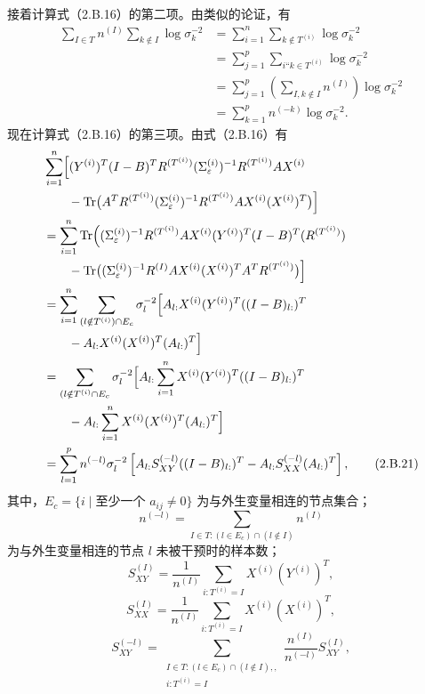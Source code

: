 接着计算式（2.B.16）的第二项。由类似的论证，有
\begin{equation}
\begin{aligned}
\sum_{I\in T}n^{(I)}\sum_{k\notin I}\log\sigma_k^{-2}
 &=\sum_{i=1}^n\sum_{k\notin T^{(i)}}\log\sigma_k^{-2}\\
 &=\sum_{j=1}^p\sum_{i\text{“}k\in T^{(i)}}\log\sigma_k^{-2}\\
 &=\sum_{j=1}^p\left(\sum_{I,k\notin I}n^{(I)}\right)\log\sigma_k^{-2}\\
 &=\sum_{k=1}^pn^{(-k)}\log\sigma_k^{-2}.
\end{aligned}\tag{2.B.20}
\end{equation}
现在计算式（2.B.16）的第三项。由式（2.B.16）有
\begingroup
\allowdisplaybreaks[2]
\begin{align}
&\sum_{i=1}^n\Bigl[(Y^{(i)})^T(I-B)^TR^{(T^{(i)})}
 (\Sigma_\varepsilon^{(i)})^{-1}R^{(T^{(i)})}AX^{(i)}\notag\\
&\qquad-\operatorname{Tr}\bigl(A^TR^{(T^{(i)})}(\Sigma_\varepsilon^{(i)})^{-1}
 R^{(T^{(i)})}AX^{(i)}(X^{(i)})^T\bigr)\Bigr]\notag\\
&=\sum_{i=1}^n\operatorname{Tr}\Bigl(
  (\Sigma_\varepsilon^{(i)})^{-1}R^{(T^{(i)})}AX^{(i)}
  (Y^{(i)})^T(I-B)^T(R^{(T^{(i)})})\notag\\
&\qquad-\operatorname{Tr}\bigl(
  (\Sigma_\varepsilon^{(i)})^{-1}R^{(I)}AX^{(i)}
  (X^{(i)})^TA^TR^{(T^{(i)})}\bigr)\Bigr]\notag\\
&=\sum_{i=1}^n\sum_{(l\notin T^{(i)})\cap E_c}
 \sigma_l^{-2}\Bigl[
 A_{l:}X^{(i)}(Y^{(i)})^T((I-B)_{l:})^T\notag\\
&\qquad-A_{l:}X^{(i)}(X^{(i)})^T(A_{l:})^T\Bigr]\notag\\
&=\sum_{(l\notin T^{(i)}\cap E_c}\sigma_l^{-2}
 \Bigl[A_{l:}\sum_{i=1}^nX^{(i)}(Y^{(i)})^T((I-B)_{l:})^T\notag\\
&\qquad-A_{l:}\sum_{i=1}^nX^{(i)}(X^{(i)})^T(A_{l:})^T\Bigr]\notag\\
&=\sum_{l=1}^pn^{(-l)}\sigma_l^{-2}
 \left[A_{l:}S_{XY}^{(-l)}((I-B)_{l:})^T
       -A_{l:}S_{XX}^{(-l)}(A_{l:})^T\right],
\tag{2.B.21}
\end{align}
\endgroup
其中，$E_c=\{i\mid\text{至少一个 }a_{ij}\ne0\}$ 为与外生变量相连的节点集合；
\[
n^{(-l)}=\sum_{I\in T:(l\in E_c)\cap(l\notin I)}n^{(I)}
\]
为与外生变量相连的节点 $l$ 未被干预时的样本数；
\[
S_{XY}^{(I)}=\frac1{n^{(I)}}\sum_{i:T^{(i)}=I}X^{(i)}(Y^{(i)})^T,
\]
\[
S_{XX}^{(I)}=\frac1{n^{(I)}}\sum_{i:T^{(i)}=I}X^{(i)}(X^{(i)})^T,
\]
\[
S_{XY}^{(-l)}
 =\sum_{\substack{I\in T:(l\in E_c)\cap(l\notin I),,\\i:T^{(i)}=I}}
   \frac{n^{(I)}}{n^{(-l)}}S_{XY}^{(I)},
\]
